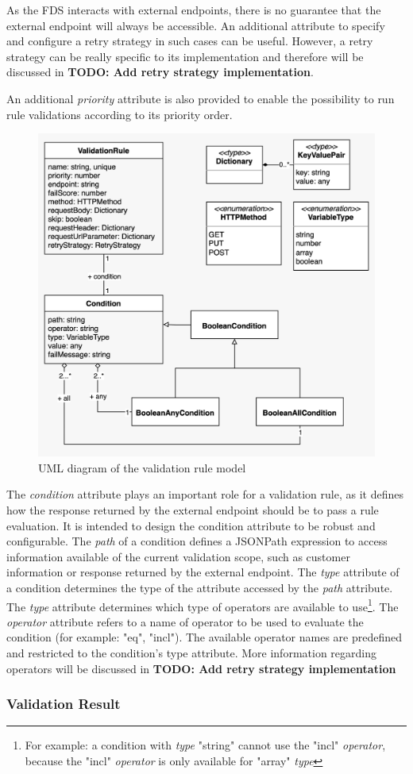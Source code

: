 As the FDS interacts with external endpoints, there is no guarantee that the external endpoint will always be accessible. An additional attribute to specify and configure a retry strategy in such cases can be useful. However, a retry strategy can be really specific to its implementation and therefore will be discussed in \textbf{TODO: Add retry strategy implementation}.

An additional \emph{priority} attribute is also provided to enable the possibility to run rule validations according to its priority order.

\begin{figure}[!h]
  \includegraphics[width=\textwidth]{diagrams/entity_validation_rule.jpeg}
  \caption{UML diagram of the validation rule model}
 \end{figure}
 
The \emph{condition} attribute plays an important role for a validation rule, as it defines how the response returned by the external endpoint should be to pass a rule evaluation. It is intended to design the condition attribute to be robust and configurable. The \emph{path} of a condition defines a JSONPath\autocite{Friesen2019} expression to access information available of the current validation scope, such as customer information or response returned by the external endpoint. The \emph{type} attribute of a condition determines the type of the attribute accessed by the \emph{path} attribute. The \emph{type} attribute determines which type of operators are available to use\footnote{For example: a condition with \emph{type} "string" cannot use the "incl" \emph{operator}, because the "incl" \emph{operator} is only available for "array" \emph{type}}. The \emph{operator} attribute refers to a name of operator to be used to evaluate the condition (for example: "eq", "incl"). The available operator names are predefined and restricted to the condition's type attribute. More information regarding operators will be discussed in \textbf{TODO: Add retry strategy implementation} %

\subsubsection{Validation Result}